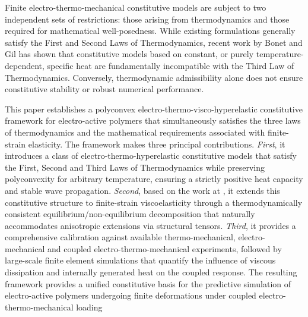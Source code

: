 
Finite electro-thermo-mechanical constitutive models are subject to two independent sets of restrictions: those arising from thermodynamics and those required for mathematical well-posedness. While existing formulations generally satisfy the First and Second Laws of Thermodynamics, recent work by Bonet and Gil \cite{BonetGil2026} has shown that constitutive models based on constant, or purely temperature-dependent, specific heat are fundamentally incompatible with the Third Law of Thermodynamics. Conversely, thermodynamic admissibility alone does not ensure constitutive stability or robust numerical performance.

This paper establishes a polyconvex electro-thermo-visco-hyperelastic constitutive framework for electro-active polymers that simultaneously satisfies the three laws of thermodynamics and the mathematical requirements associated with finite-strain elasticity. The framework makes three principal contributions. \emph{First}, it introduces a class of electro-thermo-hyperelastic constitutive models that satisfy the First, Second and Third Laws of Thermodynamics while preserving polyconvexity for arbitrary temperature, ensuring a strictly positive heat capacity and stable wave propagation. \emph{Second}, based on the work at \cite{Liu2025}, it extends this constitutive structure to finite-strain viscoelasticity through a thermodynamically consistent equilibrium/non-equilibrium decomposition that naturally accommodates anisotropic extensions via structural tensors. \emph{Third}, it provides a comprehensive calibration against available thermo-mechanical, electro-mechanical and coupled electro-thermo-mechanical experiments, followed by large-scale finite element simulations that quantify the influence of viscous dissipation and internally generated heat on the coupled response. The resulting framework provides a unified constitutive basis for the predictive simulation of electro-active polymers undergoing finite deformations under coupled electro-thermo-mechanical loading
